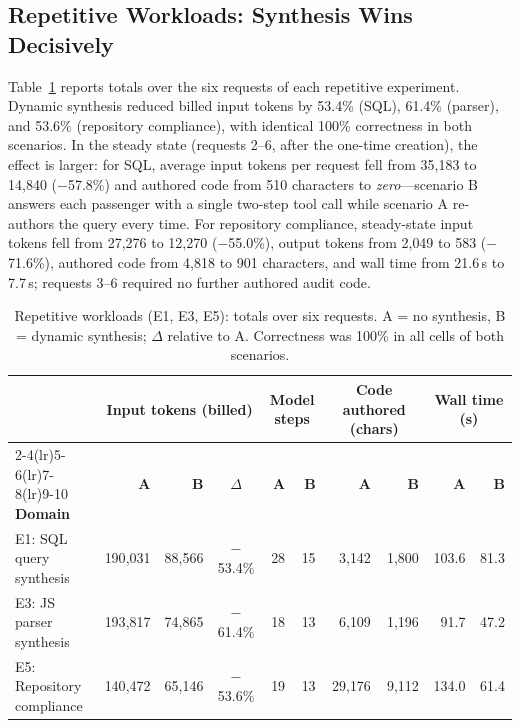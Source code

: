 \documentclass[conference]{IEEEtran}
\begin{document}
\subsection{Repetitive Workloads: Synthesis Wins Decisively}
Table~\ref{tab:repetitive} reports totals over the six requests of each
repetitive experiment. Dynamic synthesis reduced billed input tokens by
53.4\% (SQL), 61.4\% (parser), and 53.6\% (repository compliance), with
identical 100\% correctness in both scenarios. In the steady state (requests
2--6, after the one-time creation), the effect is larger: for SQL, average
input tokens per request fell from 35{,}183 to 14{,}840 ($-$57.8\%) and
authored code from 510 characters to \emph{zero}---scenario B answers each
passenger with a single two-step tool call while scenario A re-authors the
query every time. For repository compliance, steady-state input tokens fell
from 27{,}276 to 12{,}270 ($-$55.0\%), output tokens from 2{,}049 to 583
($-$71.6\%), authored code from 4{,}818 to 901 characters, and wall time from
21.6\,s to 7.7\,s; requests 3--6 required no further authored audit code.

\begin{table}[!t]
    \centering
    \caption{Repetitive workloads (E1, E3, E5): totals over six requests.
    A = no synthesis, B = dynamic synthesis; $\Delta$ relative to A.
    Correctness was 100\% in all cells of both scenarios.}
    \label{tab:repetitive}
    \footnotesize
    \begin{tabular}{@{}l rr c rr rr rr@{}}
        \toprule
        & \multicolumn{3}{c}{\textbf{Input tokens (billed)}} &
          \multicolumn{2}{c}{\textbf{Model steps}} &
          \multicolumn{2}{c}{\textbf{Code authored (chars)}} &
          \multicolumn{2}{c}{\textbf{Wall time (s)}} \\
        \cmidrule(lr){2-4}\cmidrule(lr){5-6}\cmidrule(lr){7-8}\cmidrule(lr){9-10}
        \textbf{Domain} & \textbf{A} & \textbf{B} & \textbf{$\Delta$} &
        \textbf{A} & \textbf{B} & \textbf{A} & \textbf{B} & \textbf{A} & \textbf{B} \\
        \midrule
        E1: SQL query synthesis        & 190{,}031 & 88{,}566  & $-$53.4\% & 28 & 15 & 3{,}142  & 1{,}800 & 103.6 & 81.3 \\
        E3: JS parser synthesis        & 193{,}817 & 74{,}865  & $-$61.4\% & 18 & 13 & 6{,}109  & 1{,}196 & 91.7  & 47.2 \\
        E5: Repository compliance      & 140{,}472 & 65{,}146  & $-$53.6\% & 19 & 13 & 29{,}176 & 9{,}112 & 134.0 & 61.4 \\
        \bottomrule
    \end{tabular}
\end{table}
\end{document}
